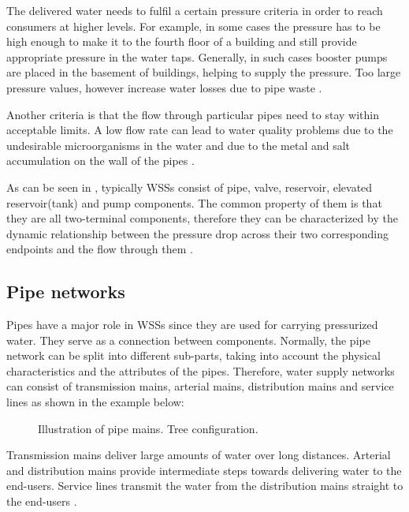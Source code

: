 \vspace{-3mm}

The delivered water needs to fulfil a certain pressure criteria in order to reach consumers at higher levels. For example, in some cases the pressure has to be high enough to make it to the fourth floor of a building and still provide appropriate pressure in the water taps. Generally, in such cases booster pumps are placed in the basement of buildings, helping to supply the pressure. Too large pressure values, however increase water losses due to pipe waste \cite{walski2003advanced}.

Another criteria is that the flow through particular pipes need to stay within acceptable limits. A low flow rate can lead to water quality problems due to the undesirable microorganisms in the water and due to the metal and salt accumulation on the wall of the pipes \cite{walski2003advanced}. 

As can be seen in , typically WSSs consist of pipe, valve, reservoir, elevated reservoir(tank) and pump components. The common property of them is that they are all two-terminal components, therefore they can be characterized by the dynamic relationship between the pressure drop across their two corresponding endpoints and the flow through them \cite{master_aau}. 

\subsection{Pipe networks}
\label{pipe_networks}

Pipes have a major role in WSSs since they are used for carrying pressurized water. They serve as a connection between components. Normally, the pipe network can be split into different sub-parts, taking into account the physical characteristics and the attributes of the pipes. Therefore, water supply networks can consist of transmission mains, arterial mains, distribution mains and service lines as shown in the example below: 

\begin{figure}[H]
\centering
 
\caption{Illustration of pipe mains. Tree configuration.}
\label{fig:pipemain_example}
\end{figure}

\vspace{-3mm}

Transmission mains deliver large amounts of water over long distances. Arterial and distribution mains provide intermediate steps towards delivering water to the end-users. Service lines transmit the water from the distribution mains straight to the end-users \cite{grigg2012water}.

